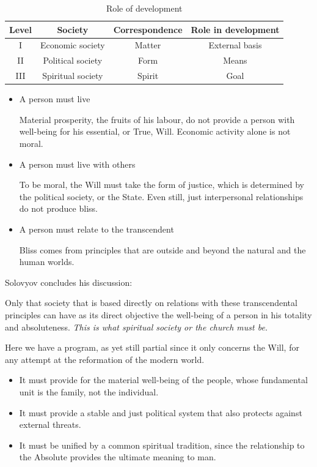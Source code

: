 \begin{table}[h]\centering\small
\begin{tabular}{cccc}\toprule
\textbf{Level} &
\textbf{Society} &
\textbf{Correspondence} &
\textbf{Role in development}\\\midrule
I &
Economic society &
Matter &
External basis\\
II &
Political society &
Form &
Means\\
III &
Spiritual society &
Spirit &
Goal\\\bottomrule
\end{tabular}
\label{tab:RoleDevelopment}
\caption{Role of development}
\end{table}
\begin{itemize}
\item A person must live 

Material prosperity, the fruits of his labour, do not provide a person with well-being for his essential, or True, Will. Economic activity alone is not moral.
\item A person must live with others 

To be moral, the Will must take the form of justice, which is determined by the political society, or the State. Even still, just interpersonal relationships do not produce bliss.
\item A person must relate to the transcendent 

Bliss comes from principles that are outside and beyond the natural and the human worlds.
\end{itemize}
Solovyov concludes his discussion:

\begin{quotex}
Only that society that is based directly on relations with these transcendental principles can have as its direct objective the well-being of a person in his totality and absoluteness. \emph{This is what spiritual society or the church must be.} 

\end{quotex}
Here we have a program, as yet still partial since it only concerns the Will, for any attempt at the reformation of the modern world.

\begin{itemize}
\item It must provide for the material well-being of the people, whose fundamental unit is the family, not the individual. 
\item It must provide a stable and just political system that also protects against external threats. 
\item It must be unified by a common spiritual tradition, since the relationship to the Absolute provides the ultimate meaning to man. 
\end{itemize}

